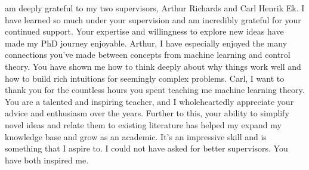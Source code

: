 \documentclass{mimosis-class/mimosis}
\numberwithin{equation}{chapter}
\begin{document}
\label{sec:org30139c0}
\begin{singlespace}
 am deeply grateful to my two supervisors, Arthur Richards and Carl Henrik Ek.
I have learned so much under your supervision and am incredibly grateful for your continued support.
Your expertise and willingness to explore new ideas have made my PhD journey enjoyable.
Arthur, I have especially enjoyed the many connections you've made between concepts from machine learning and control theory.
You have shown me how to think deeply about why things work well and how
to build rich intuitions for seemingly complex problems.
Carl, I want to thank you for the countless hours you spent teaching me machine learning theory.
You are a talented and inspiring teacher, and I wholeheartedly appreciate your advice and enthusiasm over the years.
Further to this, your ability to simplify novel ideas and relate them to existing literature has helped my
expand my knowledge base and grow as an academic.
It's an impressive skill and is something that I aspire to.
I could not have asked for better supervisors.
You have both inspired me.








\end{singlespace}
\end{document}
